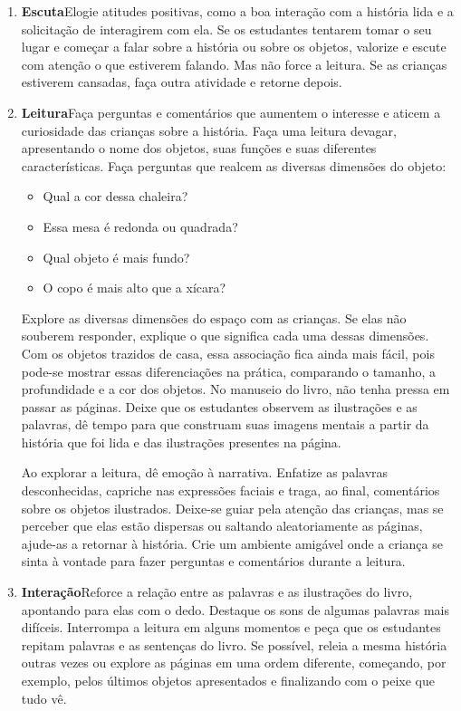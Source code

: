 \documentclass[11pt]{extarticle}
\begin{document}
\begin{enumerate}
\item \textbf{Escuta}\quad Elogie atitudes positivas, como 
a boa interação com a história lida e a solicitação de interagirem com ela. Se os estudantes tentarem 
tomar o seu lugar e começar a falar sobre a história ou sobre os objetos, valorize e escute com atenção o que estiverem falando. Mas não 
force a leitura. Se as crianças estiverem cansadas, faça outra atividade 
e retorne depois. 

\item \textbf{Leitura}\quad Faça perguntas e comentários que aumentem o 
interesse e aticem a curiosidade das crianças sobre a história. Faça 
uma leitura devagar, apresentando o nome dos objetos, suas funções e suas diferentes características.
Faça perguntas que realcem as diversas dimensões do objeto:

\begin{itemize}
\item Qual a cor dessa chaleira?
\item Essa mesa é redonda ou quadrada?
\item Qual objeto é mais fundo?
\item O copo é mais alto que a xícara?
\end{itemize}

Explore as diversas dimensões do espaço com as crianças.
Se elas não souberem responder, explique o que significa cada uma dessas dimensões.
Com os objetos trazidos de casa, essa associação fica ainda mais fácil, pois pode-se mostrar essas diferenciações na prática, comparando o tamanho, a profundidade e a cor dos objetos.
No manuseio do livro, não tenha pressa em passar as páginas. Deixe que os estudantes 
observem as ilustrações e as palavras, dê tempo para que construam suas imagens 
mentais a partir da história que foi lida e das ilustrações presentes na página. 

Ao explorar a leitura, dê emoção 
à narrativa. Enfatize as palavras desconhecidas,
capriche nas expressões faciais e traga, ao final, comentários sobre os objetos ilustrados.
Deixe-se guiar pela atenção das crianças, mas se perceber que 
elas estão dispersas ou saltando aleatoriamente as páginas, ajude-as 
a retornar à história. Crie um ambiente amigável onde a criança 
se sinta à vontade para fazer perguntas e comentários durante a leitura.

\item \textbf{Interação}\quad Reforce a relação entre as palavras e as ilustrações 
do livro, apontando para elas com o dedo. Destaque os sons de algumas 
palavras mais difíceis. Interrompa a leitura em alguns momentos e peça que 
os estudantes repitam palavras e as sentenças do livro. Se possível, 
releia a mesma história outras vezes ou explore as páginas em uma ordem 
diferente, começando, por exemplo, pelos últimos objetos apresentados e finalizando com o peixe que tudo vê.


\end{enumerate}
\end{document}
